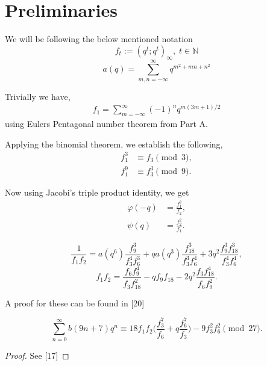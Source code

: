 \section{Preliminaries}
\begin{definition}
We will be following the below mentioned notation
\begin{equation}
    f_t := (q^t;q^t)_\infty, \; t\in \mathbb{N}
\end{equation}
\begin{equation}
    a(q) = \sum_{m,n = -\infty}^\infty q^{m^2 + mn + n^2}
\end{equation}
\end{definition}

Trivially we have,
\begin{align*}
   f_1 = \sum^\infty_{m = -\infty}(-1)^nq^{m(3m+1)/2} 
\end{align*}
using Eulers Pentagonal number theorem from Part A.

\begin{lemma}
Applying the binomial theorem, we establish the following,
\begin{align*}
    f_1^3 &\equiv f_3 \pmod 3,
   \\f_1^9 &\equiv f_3^3 \pmod 9.
\end{align*}
\end{lemma}
\begin{lemma}
Now using Jacobi's triple product identity, we get
\begin{align*}
\varphi(-q) &= \frac{f_1^2}{f_2},
\\ \psi(q) &= \frac{f_2^2}{f_1}.
\end{align*}
\end{lemma}

\begin{lemma}
\begin{equation}
    \frac{1}{f_1f_2} = a(q^6)\frac{f^3_9}{f^4_3f^3_6} + qa(q^3)\frac{f^3_{18}}{f^3_3f^4_6}+3q^2\frac{f^3_9f^3_{18}}{f^4_3f^4_6},
\end{equation}
\begin{equation}
    f_1f_2 = \frac{f_6f^4_9}{f_3f^2_{18}} -qf_9f_{18}-2q^2\frac{f_3f^4_{18}}{f_6f^2_9}.
\end{equation}
\end{lemma}
A proof for these can be found in [20]

\begin{theorem}
\begin{equation}
    \sum_{n=0}^\infty b(9n + 7)q^n \equiv 18f_1f_2\bigg(\frac{f^7_3}{f_6}+q\frac{f^7_6}{f_3}\bigg)-9f^2_3f^2_6 \pmod{27}.
\end{equation}
\end{theorem}
\begin{proof}
    See [17]
\end{proof}

